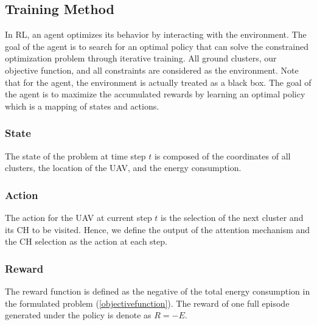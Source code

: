 \documentclass[journal]{IEEEtran}
\begin{document}
	\subsection{Training Method}
	 In RL, an agent optimizes its behavior by interacting with the environment. The goal of the agent is to search for an optimal policy that can solve the constrained optimization problem through iterative training. All ground clusters, our objective function, and all constraints are considered as the environment. Note that for the agent, the environment is actually treated as a black box. {The goal of the agent is to maximize the accumulated rewards by learning an optimal policy which is a mapping of states and actions. }
	 {\subsubsection{State} The state of the problem at time step $t$ is composed of the coordinates of all clusters, the location of the UAV, and the energy consumption.}
	 {\subsubsection{Action} The action for the UAV at current step $t$ is the selection of the next cluster and its CH to be visited. Hence, we define the output of the attention mechanism and the CH selection as the action at each step.}
	 {\subsubsection{Reward} The reward function is defined as the negative of the total energy consumption in the formulated problem (\ref{objectivefunction}). The reward of one full episode generated under the policy is denote as $R = -E$.}
	
\end{document}
